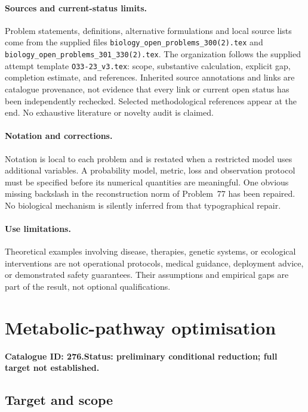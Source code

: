 \documentclass[11pt]{article}
\begin{document}
\paragraph{Sources and current-status limits.}
Problem statements, definitions, alternative formulations and local source lists
come from the supplied files
\texttt{biology\_open\_problems\_300(2).tex} and
\texttt{biology\_open\_problems\_301\_330(2).tex}.
The organization follows the supplied attempt template
\texttt{O33-23\_v3.tex}: scope, substantive calculation, explicit gap,
completion estimate, and references. Inherited source annotations and links are
catalogue provenance, not evidence that every link or current open status has
been independently rechecked. Selected methodological references appear at the
end. No exhaustive literature or novelty audit is claimed.

\paragraph{Notation and corrections.}
Notation is local to each problem and is restated when a restricted model uses
additional variables. A probability model, metric, loss and observation protocol
must be specified before its numerical quantities are meaningful. One obvious
missing backslash in the reconstruction norm of Problem~77 has been repaired.
No biological mechanism is silently inferred from that typographical repair.

\paragraph{Use limitations.}
Theoretical examples involving disease, therapies, genetic systems, or ecological
interventions are not operational protocols, medical guidance, deployment advice,
or demonstrated safety guarantees. Their assumptions and empirical gaps are part
of the result, not optional qualifications.

\setcounter{section}{275}
\section{Metabolic-pathway optimisation}
\label{prob:276}
\noindent\textbf{Catalogue ID: 276.}\quad \textbf{Status: preliminary conditional reduction; full target not established.}
\subsection{Target and scope}
\end{document}
